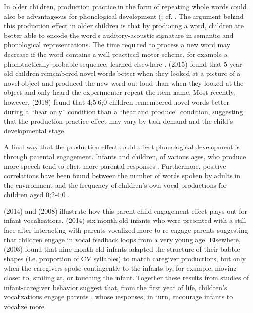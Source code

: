 \documentclass[a4paper,man,natbib,donotrepeattitle, apacite]{apa6}
\begin{document}
In older children, production practice in the form of repeating whole words could also be advantageous for phonological development (; cf. . The argument behind this production effect in older children is that by producing a word, children are better able to encode the word’s auditory-acoustic signature in semantic and phonological representations. The time required to process a new word may decrease if the word contains a well-practiced motor scheme, for example a phonotactically-probable sequence, learned elsewhere \cite{storkelComparisonHomonymNovel2005,storkelInfluencePartwordPhonotactic2011}. \citeauthor{ichtProductionEffectMemory2015} (2015) found that 5-year-old children remembered novel words better when they looked at a picture of a novel object and produced the new word out loud than when they looked at the object and only heard the experimenter repeat the item name. Most recently, however, \citeauthor{zamunerReverseProductionEffect2018} (2018) found that 4;5-6;0 children remembered novel words better during a ``hear only'' condition than a ``hear and produce'' condition, suggesting that the production practice effect may vary by task demand and the child’s developmental stage. 

A final way that the production effect could affect phonological development is through parental engagement. Infants and children, of various ages, who produce more speech tend to elicit more parental responses \cite{franklinEffectsParentalInteraction2014,goldsteinSocialFeedbackInfants2008,mcgillionWhatPavesWay2017,pretzerInfantadultVocalInteraction2019,warlaumontSocialFeedbackLoop2014}. Furthermore, positive correlations have been found between the number of words spoken by adults in the environment and the frequency of children’s own vocal productions for children aged 0;2-4;0 \cite{gilkersonImpactAdultTalk2009,orenaReliabilityLanguageEnvironment2019,weislederTalkingChildrenMatters2013}. 

\citeauthor{franklinEffectsParentalInteraction2014} (2014) and \citeauthor{goldsteinSocialFeedbackInfants2008} (2008) illustrate how this parent-child engagement effect plays out for infant vocalizations. \citeauthor{franklinEffectsParentalInteraction2014} (2014) six-month-old infants who were presented with a still face after interacting with parents vocalized more to re-engage parents suggesting that children engage in vocal feedback loops from a very young age. Elsewhere, \citeauthor{goldsteinSocialFeedbackInfants2008} (2008) found that nine-month-old infants adapted the structure of their babble shapes (i.e. proportion of CV syllables) to match caregiver productions, but only when the caregivers spoke contingently to the infants by, for example, moving closer to, smiling at, or touching the infant. Together these results from studies of infant-caregiver behavior suggest that, from the first year of life, children’s vocalizations engage parents  \cite{albertSocialFunctionsBabbling2018}, whose responses, in turn, encourage infants to vocalize more. 
\end{document}
